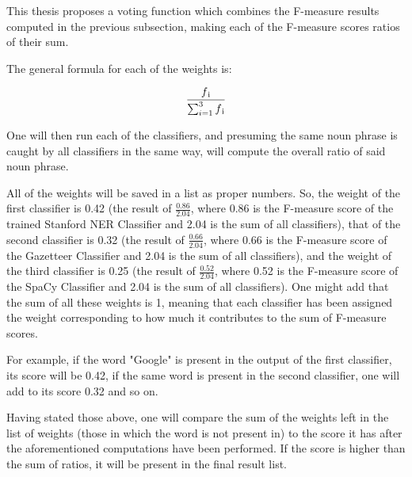 \documentclass[12pt,a4paper]{article}
\begin{document}
\qquad This thesis proposes a voting function which combines the F-measure results computed in the previous subsection, making each of the F-measure scores ratios of their sum.

\qquad The general formula for each of the weights is:

\[ \frac{f\textsubscript{i}}{\sum_{i=1}^{3} f\textsubscript{i}}\] 

\qquad One will then run each of the classifiers, and presuming the same noun phrase is caught by all classifiers in the same way, will compute the overall ratio of said noun phrase.

\qquad All of the weights will be saved in a list as proper numbers. So, the weight of the first classifier is 0.42 (the result of $\frac{0.86}{2.04}$, where 0.86 is the F-measure score of the trained Stanford NER Classifier and 2.04 is the sum of all classifiers), that of the second classifier is 0.32 (the result of $\frac{0.66}{2.04}$, where 0.66 is the F-measure score of the Gazetteer Classifier and 2.04 is the sum of all classifiers), and the weight of the third classifier is 0.25 (the result of $\frac{0.52}{2.04}$, where 0.52 is the F-measure score of the SpaCy Classifier and 2.04 is the sum of all classifiers). One might add that the sum of all these weights is 1, meaning that each classifier has been assigned the weight corresponding to how much it contributes to the sum of F-measure scores.

\qquad For example, if the word "Google" is present in the output of the first classifier, its score will be 0.42, if the same word is present in the second classifier, one will add to its score 0.32 and so on.


\qquad Having stated those above, one will compare the sum of the weights left in the list of weights (those in which the word is not present in) to the score it has after the aforementioned computations have been performed. If the score is higher than the sum of ratios, it will be present in the final result list.
\end{document}
